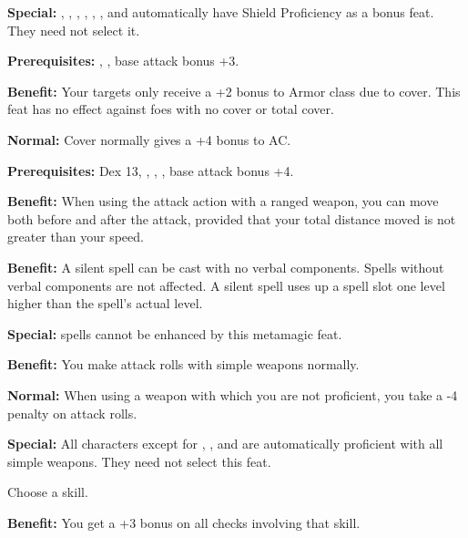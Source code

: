 \textbf{Special:} , , , , , , and  
automatically have Shield Proficiency as a bonus feat. They need not select it.


\textbf{Prerequisites:} , , base attack bonus +3.

\textbf{Benefit:} Your targets only receive a +2 bonus to Armor class due to cover. 
 This feat has no effect against foes with no cover or total cover.

\textbf{Normal:} Cover normally gives a +4 bonus to AC.


\textbf{Prerequisites:} Dex 13, , , , base attack 
bonus +4.

\textbf{Benefit:} When using the attack action with a ranged weapon, you can move 
both before and after the attack, provided that your total distance moved is not 
greater than your speed.


\textbf{Benefit:} A silent spell can be cast with no verbal components. Spells 
without verbal components are not affected. A silent spell uses up a spell slot 
one level higher than the spell's actual level.

\textbf{Special:}  spells cannot be enhanced by this metamagic feat.


\textbf{Benefit:} You make attack rolls with simple weapons normally.

\textbf{Normal:} When using a weapon with which you are not proficient, you take 
a -4 penalty on attack rolls.

\textbf{Special:} All characters except for , , and  are automatically 
proficient with all simple weapons. They need not select this feat.


Choose a skill.

\textbf{Benefit:} You get a +3 bonus on all checks involving that skill.

